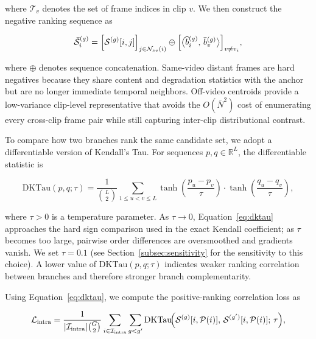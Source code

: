 \documentclass[symmetry,article,submit,pdftex,moreauthors]{Definitions/mdpi}
\begin{document}
where $\mathcal{T}_v$ denotes the set of frame indices in clip $v$. We then construct the negative ranking sequence as

\begin{equation}
\bar{\mathcal{S}}_i^{(g)} =
\Bigl[\mathcal{S}^{(g)}[i,j]\Bigr]_{j\in\mathcal{N}_{sv}(i)}
\oplus
\Bigl[\bigl\langle \widehat{b}_i^{(g)},\,\bar{b}_v^{(g)} \bigr\rangle\Bigr]_{v\neq v_i},
\end{equation}

where $\oplus$ denotes sequence concatenation. Same-video distant frames are hard negatives because they share content and degradation statistics with the anchor but are no longer immediate temporal neighbors. Off-video centroids provide a low-variance clip-level representative that avoids the $O(\bar{N}^2)$ cost of enumerating every cross-clip frame pair while still capturing inter-clip distributional contrast.

To compare how two branches rank the same candidate set, we adopt a differentiable version of Kendall's Tau. For sequences $p,q\in\mathbb{R}^{L}$, the differentiable statistic is

\begin{equation}
\mathrm{DKTau}(p,q;\tau)
= \frac{1}{\binom{L}{2}}
\sum_{1\le u < v \le L}
\tanh\!\!\left(\frac{p_u-p_v}{\tau}\right)
\cdot
\tanh\!\!\left(\frac{q_u-q_v}{\tau}\right),
\label{eq:dktau}
\end{equation}

where $\tau>0$ is a temperature parameter. As $\tau\rightarrow 0$, Equation~\eqref{eq:dktau} approaches the hard sign comparison used in the exact Kendall coefficient; as $\tau$ becomes too large, pairwise order differences are oversmoothed and gradients vanish. We set $\tau=0.1$ (see Section~\ref{subsec:sensitivity} for the sensitivity to this choice). A lower value of $\mathrm{DKTau}(p,q;\tau)$ indicates weaker ranking correlation between branches and therefore stronger branch complementarity.

Using Equation~\eqref{eq:dktau}, we compute the positive-ranking correlation loss as

\begin{equation}
\mathcal{L}_{\text{intra}} =
\frac{1}{|\mathcal{I}_{\text{intra}}| \binom{G}{2}}
\sum_{i\in\mathcal{I}_{\text{intra}}}
\sum_{g < g'}
\mathrm{DKTau}\!\Bigl(
\mathcal{S}^{(g)}[i,\mathcal{P}(i)],\,
\mathcal{S}^{(g')}[i,\mathcal{P}(i)];\,\tau
\Bigr),
\label{eq:loss_intra}
\end{equation}
\end{document}
